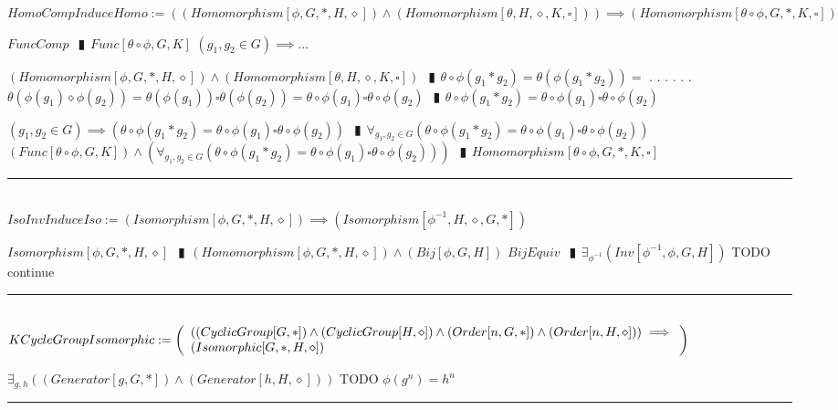\documentclass{book}
\newcommand{\abr}{:=}
\newcommand{\cont}{\phantom{.}. . .\phantom{.}}
\newcommand{\pipe}{$\phantom{(}\vrectangleblack\phantom{)}$}
\newcommand{\pr}[1]{\left(#1\right)}
\begin{document}
$HomoCompInduceHomo \abr \pr{(Homomorphism[\phi, G, *, H, \diamond]) \land (Homomorphism[\theta, H, \diamond, K, \square])} \implies (Homomorphism[\theta \circ \phi, G, *, K, \square])$
\begin{enumerate}
  \lit $FuncComp$ \pipe $Func[\theta \circ \phi, G, K]$
  \lit $(g_1, g_2 \in G) \implies \ldots$
  \begin{enumerate}
    \lit $(Homomorphism[\phi, G, *, H, \diamond]) \land (Homomorphism[\theta, H, \diamond, K, \square])$ \pipe $\theta \circ \phi(g_1 * g_2) = \theta\pr{\phi(g_1 * g_2)} =$ \cont
  \lit \cont $\theta\pr{\phi(g_1) \diamond \phi(g_2)} = \theta\pr{\phi(g_1)} \square \theta\pr{\phi(g_2)} = \theta \circ \phi(g_1) \square \theta \circ \phi(g_2)$ \pipe $\theta \circ \phi(g_1 * g_2) = \theta \circ \phi(g_1) \square \theta \circ \phi(g_2)$
  \end{enumerate}
  \lit $(g_1, g_2 \in G) \implies \pr{\theta \circ \phi(g_1 * g_2) = \theta \circ \phi(g_1) \square \theta \circ \phi(g_2)}$ \pipe $\forall_{g_1, g_2 \in G}\pr{\theta \circ \phi(g_1 * g_2) = \theta \circ \phi(g_1) \square \theta \circ \phi(g_2)}$
  \lit $(Func[\theta \circ \phi, G, K]) \land \pr{\forall_{g_1, g_2 \in G}\pr{\theta \circ \phi(g_1 * g_2) = \theta \circ \phi(g_1) \square \theta \circ \phi(g_2)}}$ \pipe $Homomorphism[\theta \circ \phi, G, *, K, \square]$
\end{enumerate} \vspace{.75mm} \hrule \vspace{.75mm} \ \\ 

$IsoInvInduceIso \abr (Isomorphism[\phi, G, *, H, \diamond]) \implies (Isomorphism[\phi^{-1}, H, \diamond, G, *])$
\begin{enumerate}
  \lit $Isomorphism[\phi, G, *, H, \diamond]$ \pipe $(Homomorphism[\phi, G, *, H, \diamond]) \land (Bij[\phi, G, H])$
  \lit $BijEquiv$ \pipe $\exists_{\phi^{-1}}(Inv[\phi^{-1}, \phi, G, H])$
  \lit TODO continue
\end{enumerate} \vspace{.75mm} \hrule \vspace{.75mm} \ \\ 

$KCycleGroupIsomorphic \abr \left(\begin{array}{ll}
  \pr{(CyclicGroup[G, *]) \hfill \land \hfill (CyclicGroup[H, \diamond]) \hfill \land \hfill (Order[n, G, *]) \hfill \land \hfill (Order[n, H, \diamond])} \hfill \implies \hfill \\
  (Isomorphic[G, *, H, \diamond])
\end{array}\right)$
\begin{enumerate}
  \lit $\exists_{g, h}\pr{(Generator[g, G, *]) \land (Generator[h, H, \diamond])}$
  \lit TODO $\phi(g^n) = h^n$
\end{enumerate} \vspace{.75mm} \hrule \vspace{.75mm} \ \\ 
\end{document}
